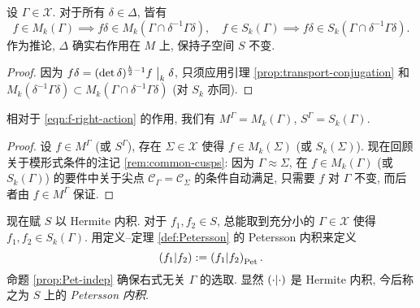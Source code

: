 \begin{lemma}
	设 $\Gamma \in \mathcal{X}$. 对于所有 $\delta \in \Delta$, 皆有
	\[ f \in M_k(\Gamma) \implies f\delta \in M_k\left( \Gamma \cap \delta^{-1} \Gamma \delta\right), \quad f \in S_k(\Gamma) \implies f\delta \in S_k\left( \Gamma \cap \delta^{-1} \Gamma \delta\right). \]
	作为推论, $\Delta$ 确实右作用在 $M$ 上, 保持子空间 $S$ 不变.
\end{lemma}
\begin{proof}
	因为 $f\delta = (\det\delta)^{\frac{k}{2}-1} f \;\big|_{k} \; \delta$, 只须应用引理 \ref{prop:transport-conjugation} 和 $M_k(\delta^{-1} \Gamma \delta) \subset M_k(\Gamma \cap \delta^{-1} \Gamma \delta)$ (对 $S_k$ 亦同).
\end{proof}

\begin{lemma}\label{prop:M-invariants}
	相对于 \eqref{eqn:f-right-action} 的作用, 我们有 $M^\Gamma = M_k(\Gamma)$, $S^\Gamma = S_k(\Gamma)$.
\end{lemma}
\begin{proof}
	设 $f \in M^\Gamma$ (或 $S^\Gamma$), 存在 $\Sigma \in \mathcal{X}$ 使得 $f \in M_k(\Sigma)$ (或 $S_k(\Sigma)$). 现在回顾关于模形式条件的注记 \ref{rem:common-cusps}: 因为 $\Gamma \approx \Sigma$, 在 $f \in M_k(\Gamma)$ (或 $S_k(\Gamma)$) 的要件中关于尖点 $\mathcal{C}_\Gamma = \mathcal{C}_\Sigma$ 的条件自动满足, 只需要 $f$ 对 $\Gamma$ 不变, 而后者由 $f \in M^\Gamma$ 保证.
\end{proof}

现在赋 $S$ 以 Hermite 内积. 对于 $f_1, f_2 \in S$, 总能取到充分小的 $\Gamma \in \mathcal{X}$ 使得 $f_1, f_2 \in S_k(\Gamma)$. 用定义--定理 \ref{def:Petersson} 的 Petersson 内积来定义
\[ \left( f_1 \middle| f_2 \right) := \left( f_1 \middle| f_2 \right)_{\mathrm{Pet}}. \]
命题 \ref{prop:Pet-indep} 确保右式无关 $\Gamma$ 的选取. 显然 $\left( \cdot \middle| \cdot \right)$ 是 Hermite 内积, 今后称之为 $S$ 上的 \emph{Petersson 内积}.

